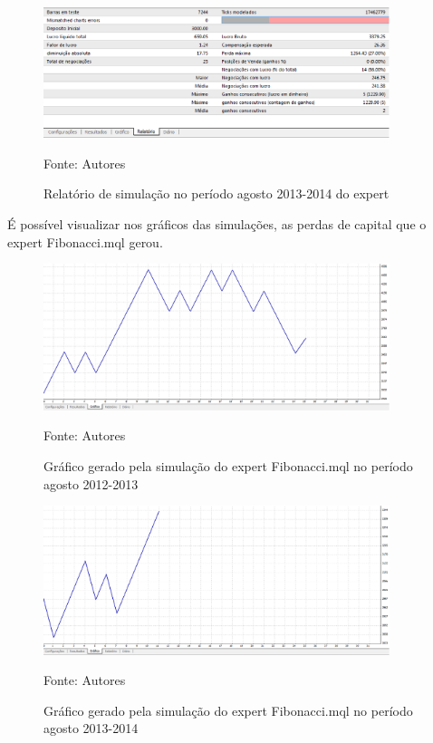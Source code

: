 \begin{figure}[htp]
\centering
\includegraphics[width=0.9\textwidth]{figuras/protocoloFib2}
\caption{Relatório de simulação no período agosto 2013-2014 do expert}{Fonte: Autores} 
\label{protocoloFib2}
\end{figure}

É possível visualizar nos gráficos das simulações, as perdas de capital que o expert Fibonacci.mql gerou.

\begin{figure}[htp]
\centering
\includegraphics[width=0.9\textwidth]{figuras/protocoloFib3}
\caption{Gráfico gerado pela simulação do expert Fibonacci.mql no período agosto 2012-2013}{Fonte: Autores} 
\label{protocoloFib3}
\end{figure}

\begin{figure}[htp]
\centering
\includegraphics[width=0.9\textwidth]{figuras/protocoloFib4}
\caption{Gráfico gerado pela simulação do expert Fibonacci.mql no período agosto 2013-2014}{Fonte: Autores} 
\label{protocoloFib4}
\end{figure}

